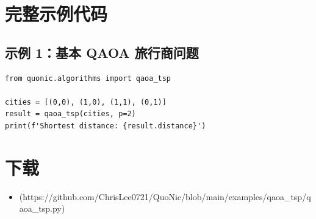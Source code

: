\documentclass[12pt,a4paper]{article}
\begin{document}
\section{完整示例代码}

\subsection{示例 1：基本 QAOA 旅行商问题}

\begin{verbatim}
from quonic.algorithms import qaoa_tsp

cities = [(0,0), (1,0), (1,1), (0,1)]
result = qaoa_tsp(cities, p=2)
print(f'Shortest distance: {result.distance}')
\end{verbatim}

\section{下载}

\begin{itemize}
  \item [qaoa\_tsp.py](https://github.com/ChrisLee0721/QuoNic/blob/main/examples/qaoa_tsp/qaoa_tsp.py)
\end{itemize}
\end{document}
